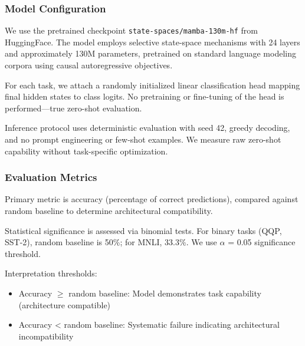 \begin{table}[htbp]
\centering
{}
\end{table}

\subsubsection{Model Configuration}

We use the pretrained checkpoint \texttt{state-spaces/mamba-130m-hf} from HuggingFace. The model employs selective state-space mechanisms with 24 layers and approximately 130M parameters, pretrained on standard language modeling corpora using causal autoregressive objectives.

For each task, we attach a randomly initialized linear classification head mapping final hidden states to class logits. No pretraining or fine-tuning of the head is performed---true zero-shot evaluation.

Inference protocol uses deterministic evaluation with seed 42, greedy decoding, and no prompt engineering or few-shot examples. We measure raw zero-shot capability without task-specific optimization.

\subsubsection{Evaluation Metrics}

Primary metric is accuracy (percentage of correct predictions), compared against random baseline to determine architectural compatibility.

Statistical significance is assessed via binomial tests. For binary tasks (QQP, SST-2), random baseline is 50\%; for MNLI, 33.3\%. We use $\alpha$ = 0.05 significance threshold.

Interpretation thresholds:
\begin{itemize}
\item Accuracy $\geq$ random baseline: Model demonstrates task capability (architecture compatible)
\item Accuracy < random baseline: Systematic failure indicating architectural incompatibility
\end{itemize}

